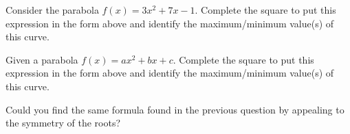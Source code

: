 \begin{prob}
Consider the parabola $f(x) = 3x^2 + 7x - 1$. Complete the square to
put this expression in the form above and identify the maximum/minimum
value(s) of this curve.
\end{prob}


\begin{prob}
Given a parabola $f(x) = ax^2 + bx +c$. Complete the square to put
this expression in the form above and identify the maximum/minimum
value(s) of this curve.
\end{prob}


\begin{prob}
Could you find the same formula found in the previous question by
appealing to the symmetry of the roots?
\end{prob}





